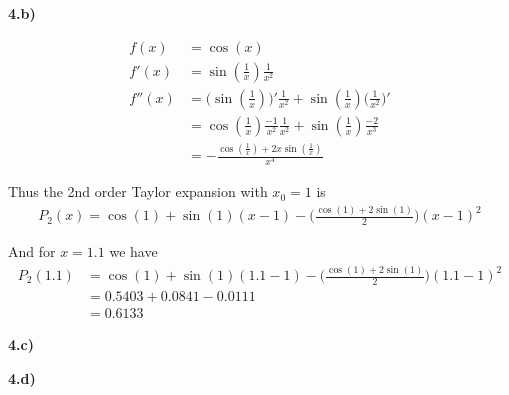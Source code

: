 \textbf{4.b)}

\begin{align*}
f(x) &= \cos(x) \\
f'(x) &= \sin(\frac{1}{x}) \frac{1}{x^2}\\
f''(x) &= \Big( \sin(\frac{1}{x}) \Big)' \frac{1}{x^2} + \sin(\frac{1}{x}) \Big( \frac{1}{x^2}\Big)'\\
&= \cos(\frac{1}{x})\frac{-1}{x^2}\frac{1}{x^2} + \sin(\frac{1}{x}) \frac{-2}{x^3}\\
&= -\frac{\cos(\frac{1}{x}) + 2x\sin(\frac{1}{x})}{x^4}
\end{align*}

Thus the 2nd order Taylor expansion with $x_0 = 1$ is
\begin{align*}
P_2(x) = \cos(1) + \sin(1)(x-1) - \Big( \frac{\cos(1)+2\sin(1)}{2} \Big)(x - 1)^2
\end{align*}

And for $x = 1.1$ we have
\begin{align*}
P_2(1.1) &= \cos(1) + \sin(1)(1.1-1) - \Big( \frac{\cos(1)+2\sin(1)}{2} \Big)(1.1 - 1)^2\\
&= 0.5403 + 0.0841 - 0.0111\\
&= 0.6133
\end{align*}

\textbf{4.c)}

\incomplete

\textbf{4.d)}


